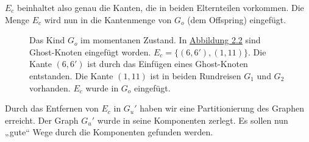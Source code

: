 $E_c$
beinhaltet also genau die Kanten, die in beiden Elternteilen vorkommen. Die
Menge $E_c$ wird nun in die Kantenmenge von $G_o$ (dem Offspring)
eingefügt.
\begin{figure}[hb]
  \label{fig:offspring_1}
\centering
{}
  \caption[Kind $G_o$ nach Einfügen der gemeinsamen Kantenmenge $E_c$]
  {Das Kind $G_o$ im momentanen Zustand. In
  \hyperref[fig:ghostnodes]{Abbildung 2.2} sind Ghost-Knoten eingefügt
  worden. $E_c = \{(6,6'),(1,11)\}$. Die Kante $(6,6')$ ist durch das
  Einfügen eines Ghost-Knoten entstanden. Die Kante $(1,11)$ ist in beiden
  Rundreisen $G_1$ und $G_2$ vorhanden. $E_c$ wurde in $G_o$ eingefügt.}
\end{figure}
\noindent
Durch das Entfernen von $E_c$ in $G_u'$ haben wir eine Partitionierung
des Graphen erreicht. Der Graph $G_u'$ wurde in seine Komponenten
zerlegt. Es sollen nun „gute“ Wege durch die Komponenten gefunden
werden.
